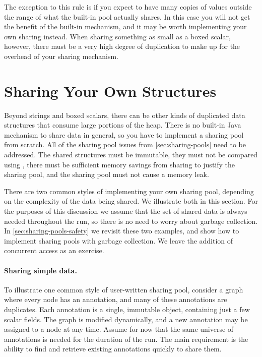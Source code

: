 The exception to this rule is if you expect to have many copies
of values outside the range of what the built-in pool
actually shares. In this case you will not get the benefit of the built-in
mechanism, and it may be worth implementing your own sharing instead.  When
sharing something as small as a boxed scalar, however, there must be a very
high degree of duplication to make up for the overhead of your
sharing mechanism.

\section{Sharing Your Own Structures}
\label{sec:canonicalizing-maps}

Beyond strings and boxed scalars, there can be other kinds of
duplicated data structures that consume large portions of the heap. 
There is no built-in Java mechanism to share data
in general, so you have to implement a sharing pool from
scratch. All of the sharing pool issues from \autoref{sec:sharing-pools} need
to be addressed. The shared structures must be immutable, they must not be
compared using \code{==}, there must be sufficient memory savings from sharing
to justify the sharing pool, and the sharing pool must not cause a memory leak. 

There are two common styles of implementing your own sharing pool, depending on
the complexity of the data being shared.  We illustrate both in this section. 
For the purposes of this discussion we assume that the set of shared data is
always needed throughout the run, so there is no need to worry about garbage collection. In
\autoref{sec:sharing-pools-safety} we revisit these two examples, and show how
to implement sharing pools with garbage collection.  
We leave the addition of concurrent access as an exercise. 

\paragraph{Sharing simple data.} To illustrate one common style of
user-written sharing pool, consider a graph where every node has an
annotation, and many of these annotations are duplicates.
Each annotation is a single, immutable 
object, containing just a few scalar fields. The graph is modified
dynamically, and a new annotation may be assigned to a node at any
time. Assume for now that the same universe of annotations is needed for the
duration of the run.
The main requirement is the ability to find and
retrieve existing annotations quickly to share them.


